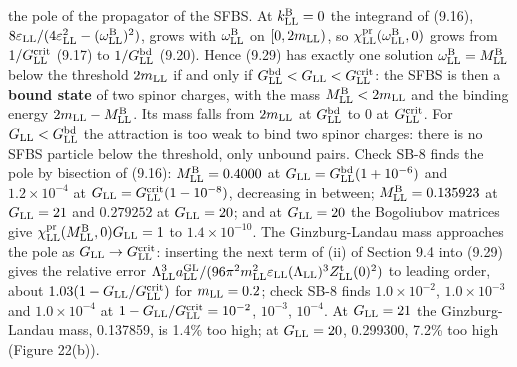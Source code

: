 \documentclass[
  10pt,
]{article}
\begin{document}
the pole of the propagator of the SFBS. At \(k^{\rm B}_{\rm LL}=0\) the
integrand of (9.16),
\(8\varepsilon_{\rm LL}/(4\varepsilon_{\rm LL}^2-(\omega^{\rm B}_{\rm LL})^2)\),
grows with \(\omega^{\rm B}_{\rm LL}\) on \([0,2m_{\rm LL})\), so
\(\chi^{\rm pr}_{\rm LL}(\omega^{\rm B}_{\rm LL},0)\) grows from
\(1/G^{\rm crit}_{\rm LL}\) (9.17) to \(1/G^{\rm bd}_{\rm LL}\) (9.20).
Hence (9.29) has exactly one solution
\(\omega^{\rm B}_{\rm LL}=M^{\rm B}_{\rm LL}\) below the threshold
\(2m_{\rm LL}\) if and only if
\(G^{\rm bd}_{\rm LL}<G_{\rm LL}<G^{\rm crit}_{\rm LL}\): the SFBS is
then a \textbf{bound state} of two spinor charges, with the mass
\(M^{\rm B}_{\rm LL}<2m_{\rm LL}\) and the binding energy
\(2m_{\rm LL}-M^{\rm B}_{\rm LL}\). Its mass falls from \(2m_{\rm LL}\)
at \(G^{\rm bd}_{\rm LL}\) to 0 at \(G^{\rm crit}_{\rm LL}\). For
\(G_{\rm LL}<G^{\rm bd}_{\rm LL}\) the attraction is too weak to bind
two spinor charges: there is no SFBS particle below the threshold, only
unbound pairs. Check SB-8 finds the pole by bisection of (9.16):
\(M^{\rm B}_{\rm LL}=0.4000\) at
\(G_{\rm LL}=G^{\rm bd}_{\rm LL}(1+10^{-6})\) and \(1.2\times10^{-4}\)
at \(G_{\rm LL}=G^{\rm crit}_{\rm LL}(1-10^{-8})\), decreasing in
between; \(M^{\rm B}_{\rm LL}=0.135923\) at \(G_{\rm LL}=21\) and
\(0.279252\) at \(G_{\rm LL}=20\); and at \(G_{\rm LL}=20\) the
Bogoliubov matrices give
\(\chi^{\rm pr}_{\rm LL}(M^{\rm B}_{\rm LL},0)G_{\rm LL}=1\) to
\(1.4\times10^{-10}\). The Ginzburg-Landau mass approaches the pole as
\(G_{\rm LL}\to G^{\rm crit}_{\rm LL}\): inserting the next term of (ii)
of Section 9.4 into (9.29) gives the relative error
\(\Lambda_{\rm LL}^3a^{\rm GL}_{\rm LL}/(96\pi^2m_{\rm LL}^2\varepsilon_{\rm LL}(\Lambda_{\rm LL})^3Z^{\rm t}_{\rm LL}(0)^2)\)
to leading order, about \(1.03(1-G_{\rm LL}/G^{\rm crit}_{\rm LL})\) for
\(m_{\rm LL}=0.2\); check SB-8 finds \(1.0\times10^{-2}\),
\(1.0\times10^{-3}\) and \(1.0\times10^{-4}\) at
\(1-G_{\rm LL}/G^{\rm crit}_{\rm LL}=10^{-2}\), \(10^{-3}\),
\(10^{-4}\). At \(G_{\rm LL}=21\) the Ginzburg-Landau mass, 0.137859, is
1.4\% too high; at \(G_{\rm LL}=20\), 0.299300, 7.2\% too high (Figure
22(b)).
\end{document}
